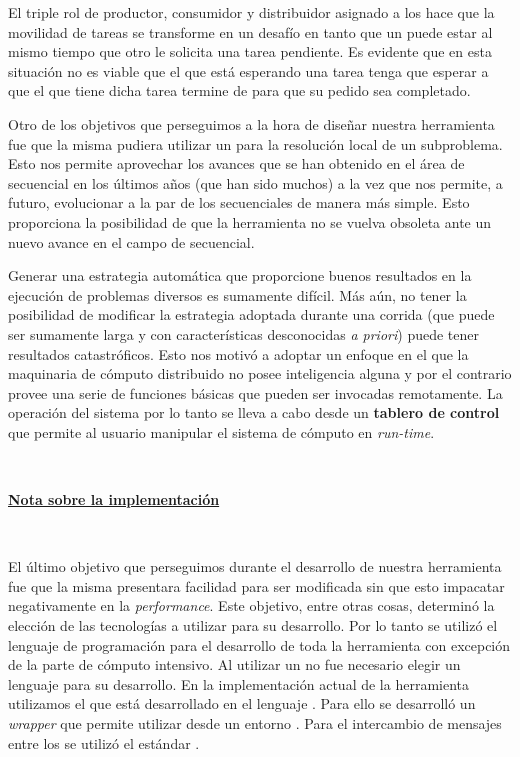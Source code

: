 El triple rol de productor, consumidor y distribuidor asignado a los \ws hace
que la movilidad de tareas se transforme en un desafío en tanto que un \w
puede estar \solveando al mismo tiempo que otro \w le solicita una tarea
pendiente. Es evidente que en esta situación no es viable que el \w que está
esperando una tarea tenga que esperar a que el \w que tiene dicha tarea
termine de \solvear para que su pedido sea completado.

Otro de los objetivos que perseguimos a la hora de diseñar nuestra herramienta
fue que la misma pudiera utilizar un \ssolver \ots para la resolución local de
un subproblema. Esto nos permite aprovechar los avances que se han obtenido en
el área de \ssolving secuencial en los últimos años (que han sido muchos) a la
vez que nos permite, a futuro, evolucionar a la par de los \ssolvers
secuenciales de manera más simple. Esto proporciona la posibilidad de que la
herramienta no se vuelva obsoleta ante un nuevo avance en el campo de
\ssolving secuencial.

\newcommand{\rt}{\emph{run-time}\xspace}
\newcommand{\apriori}{\emph{a priori}\xspace}

Generar una estrategia automática que proporcione buenos resultados en la
ejecución de problemas diversos es sumamente difícil. Más aún, no tener la
posibilidad de modificar la estrategia adoptada durante una corrida (que puede
ser sumamente larga y con características desconocidas \apriori) puede tener
resultados catastróficos. Esto nos motivó a adoptar un enfoque en el que la
maquinaria de cómputo distribuido no posee inteligencia alguna y por el
contrario provee una serie de funciones básicas que pueden ser invocadas
remotamente. La operación del sistema por lo tanto se lleva a cabo desde un
\textbf{tablero de control} que permite al usuario manipular el sistema de
cómputo en \rt.

\

\noindent\underline{\textbf{Nota sobre la implementación}}

\

El último objetivo que perseguimos durante el desarrollo de nuestra
herramienta fue que la misma presentara facilidad para ser modificada sin que
esto impacatar negativamente en la \emph{performance}. Este objetivo, entre
otras cosas, determinó la elección de las tecnologías a utilizar para su
desarrollo. Por lo tanto se utilizó el lenguaje de programación \Python para
el desarrollo de toda la herramienta con excepción de la parte de cómputo
intensivo. Al utilizar un \ssolver \ots no fue necesario elegir un lenguaje
para su desarrollo. En la implementación actual de la herramienta utilizamos
el \ssolver \minisatdosveinte que está desarrollado en el lenguaje \cpp. Para
ello se desarrolló un \emph{wrapper} que permite utilizar \minisat desde un
entorno \Python. Para el intercambio de mensajes entre los \ws se utilizó el
estándar \mpi.


